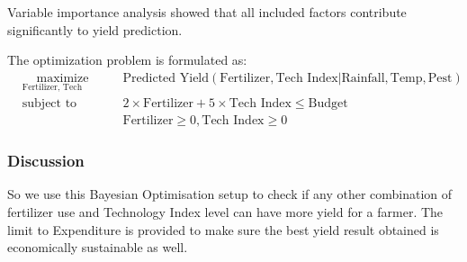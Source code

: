 Variable importance analysis showed that all included factors contribute significantly to yield prediction.

The optimization problem is formulated as:
\begin{equation}
    \begin{aligned}
    & \underset{\text{Fertilizer, Tech Index}}{\text{maximize}}
    & & \text{Predicted Yield}(\text{Fertilizer}, \text{Tech Index} | \text{Rainfall}, \text{Temp}, \text{Pest}) \\
    & \text{subject to}
    & & 2 \times \text{Fertilizer} + 5 \times \text{Tech Index} \leq \text{Budget} \\
    & & & \text{Fertilizer} \geq 0, \text{Tech Index} \geq 0
    \end{aligned}
\end{equation}

\subsubsection{Discussion}
So we use this Bayesian Optimisation setup to check if any other combination of fertilizer use and Technology Index level can have more yield for a farmer. The limit to Expenditure is provided to make sure the best yield result obtained is economically sustainable as well.



